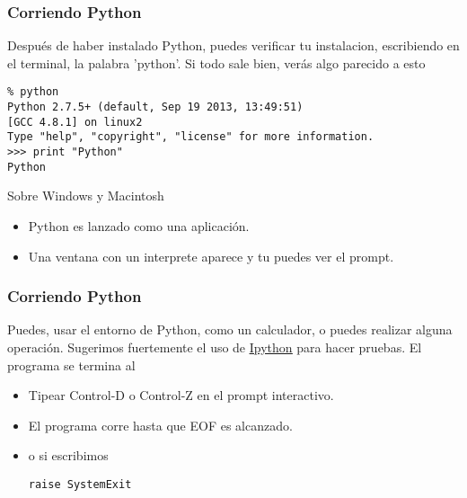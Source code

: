 \documentclass[10pt]{beamer}
\begin{document}
\begin{frame}[fragile]
\frametitle{Corriendo Python}

Despu\'es de haber instalado Python, puedes verificar tu instalacion, escribiendo en el terminal, la palabra 'python'. Si todo sale bien, ver\'as algo parecido a esto

\vspace{0.3cm}

\begin{lstlisting}
% python
Python 2.7.5+ (default, Sep 19 2013, 13:49:51) 
[GCC 4.8.1] on linux2
Type "help", "copyright", "license" for more information.
>>> print "Python"
Python
\end{lstlisting}


\vspace{0.3cm}

Sobre Windows y Macintosh

\begin{itemize}
\item Python es lanzado como una aplicaci\'on.
\item Una ventana con un interprete aparece y tu puedes ver el prompt.
\end{itemize}
\end{frame}

\begin{frame}[fragile]
\frametitle{Corriendo Python}
Puedes, usar el entorno de Python, como un calculador, o puedes realizar alguna operaci\'on. Sugerimos fuertemente el uso de \href{http://ipython.org/}{\underline{Ipython}} para hacer pruebas. El programa se termina al  

\vspace{0.3cm}


\begin{itemize}
\item Tipear Control-D o Control-Z en el prompt interactivo.
\item El programa corre hasta que EOF es alcanzado.
\item o si escribimos
\begin{lstlisting}
raise SystemExit
\end{lstlisting}
\end{itemize}
\end{frame}
\end{document}
